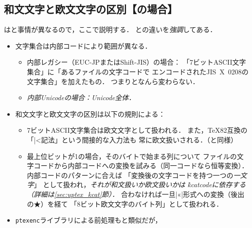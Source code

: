 \documentclass[a4paper,11pt,nomag,dvipdfmx]{jsarticle}
\def\code#1{\texttt{#1}}
\begin{document}
\subsection{和文文字と欧文文字の区別【\upTeX の場合】}
\upTeX は\pTeX と事情が異なるので，ここで説明する．
\pTeX との違いを\emph{強調}してある．

\begin{itemize}
  \item 文字集合は内部コードにより範囲が異なる．
    \begin{itemize}
      \item 内部レガシー（EUC-JPまたはShift-JIS）の場合：
        「7ビットASCII文字集合」に「あるファイルの文字コードで
        エンコードされたJIS~X~0208の文字集合」を加えたもの．
        つまり\pTeX となんら変わらない．
      \item \emph{内部Unicodeの場合：Unicode全体．}
    \end{itemize}
  \item 和文文字と欧文文字の区別は以下の規則による：
%
\begin{itemize}
 \item 7ビットASCII文字集合は欧文文字として扱われる．
    また，\TeX82互換の「|^^|記法」という間接的な入力法も
    常に欧文扱いされる．（\pTeX と同様）
 \item 最上位ビットが1の場合，そのバイトで始まる列について
    ファイルの文字コードから内部コードへの変換を試みる（同一コードなら恒等変換）．
    内部コードのパターンに合えば
    「変換後の文字コードを持つ一つの\emph{一文字}」
    として扱われ，\emph{それが和文扱いか欧文扱いかは
    \.{kcatcode}に依存する（詳細は\ref{sec:uptex_kcat}節）．}
    合わなければ一旦|^^ab|形式への変換（後出の★）を経て
    「8ビット欧文文字のバイト列」として扱われる．
\end{itemize}
%
 \item \code{ptexenc}ライブラリによる前処理も\pTeX と類似だが，

\end{itemize}
\end{document}
